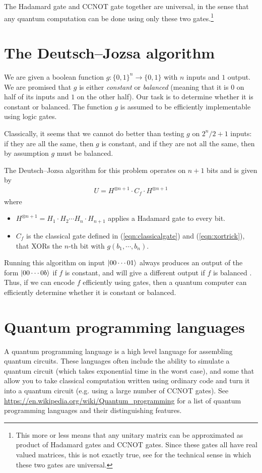 \documentclass[a4paper, 11pt]{article}
\theoremstyle{definition}
\begin{document}
The Hadamard gate and CCNOT gate together are universal, in the sense that any quantum computation can be done using only these two gates.\footnote{This more or less means that any unitary matrix can be approximated as product of Hadamard gates and CCNOT gates.
Since these gates all have real valued matrices, this is not exactly true, see \cite{aharonovSimpleProofThat2003} for the technical sense in which these two gates are universal.}

\section{The Deutsch–Jozsa algorithm}

We are given a boolean function $g : \{0,1\}^n \to \{0,1\}$ with $n$ inputs and $1$ output.
We are promised that $g$ is either \emph{constant} or \emph{balanced} (meaning that it is $0$ on half of its inputs and $1$ on the other half).
Our task is to determine whether it is constant or balanced.
The function $g$ is assumed to be efficiently implementable using logic gates.

Classically, it seems that we cannot do better than testing $g$ on $2^n/2+ 1$ inputs:
if they are all the same, then $g$ is constant, and if they are not all the same, then by assumption $g$ must be balanced.

The Deutsch–Jozsa algorithm for this problem operates on $n+1$ bits and is given by
\begin{align*}
  U = H^{\otimes n+1} \cdot C_f \cdot H^{\otimes n+1}
\end{align*}
where
\begin{itemize}
  \item $H^{\otimes n+1} = H_1 \cdot H_2 \cdots H_n \cdot H_{n+1}$ applies a Hadamard gate to every bit.
  \item $C_f$ is the classical gate defined in (\ref{eqn:classicalgate}) and (\ref{eqn:xortrick}), that XORs the $n$-th bit with $g(b_1,\cdots,b_{n})$.
\end{itemize}

Running this algorithm on input $\ket{00\cdots01}$ always produces an output of the form $\ket{00\cdots0b}$ if $f$ is constant,
and will give a different output if $f$ is balanced \cite{DeutschJozsaAlgorithm2021}.
Thus, if we can encode $f$ efficiently using gates, then a quantum computer can efficiently determine whether it is constant or balanced.

\section{Quantum programming languages}

A quantum programming language is a high level language for assembling quantum circuits.
These languages often include the ability to simulate a quantum circuit (which takes exponential time in the worst case),
and some that allow you to take classical computation written using ordinary code and turn it into a quantum circuit (e.g. using a large number of CCNOT gates).
See \url{https://en.wikipedia.org/wiki/Quantum_programming} for a list of quantum programming languages and their distinguishing features.



\end{document}
